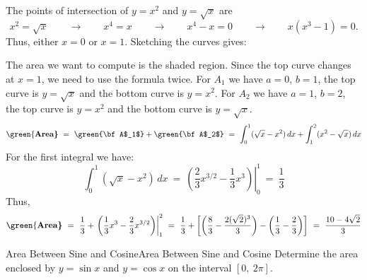 \begin{solution}
The points of intersection of $y=x^2$ and $y=\sqrt x$ are
$$x^2=\sqrt x\qquad\to \qquad x^4=x\qquad\to \qquad x^4-x=0 \qquad\to \qquad x(x^3-1)=0.$$
Thus, either $x=0$ or $x=1$.
Sketching the curves gives:



The area we want to compute is the shaded region. 
Since the top curve changes at $x=1$, we need to use the formula twice. 
For $A_1$ we have $a=0$, $b=1$, the top curve is $y=\sqrt x$ and the bottom curve is $y=x^2$. 
For $A_2$ we have $a=1$, $b=2$, the top curve is $y=x^2$ and the bottom curve is $y=\sqrt x$. 
$$\mbox{\green{\bf Area}}
~=~\mbox{\green{\bf A$_1$}}+\mbox{\green{\bf A$_2$}}  
~=~\int_0^1(\sqrt x-x^2)\,dx+\int_1^2(x^2-\sqrt x)\,dx$$
For the first integral we have:
$$\int_0^1(\sqrt x-x^2)\,dx  
~=~\left.\left(\frac{2}{3}x^{3/2}-\frac{1}{3}x^3\right)\right|_0^1  
~=~\frac{1}{3}$$
Thus,
$$\mbox{\green{\bf Area}}~=~\frac{1}{3}+\left.\left(\frac{1}{3}x^3-\frac{2}{3}x^{3/2}\right)\right|_1^2 
~=~\frac{1}{3}+\left[\left(\frac{8}{3}-\frac{2(\sqrt 2)^3}{3}\right)-\left(\frac{1}{3}-\frac{2}{3}\right)\right] 
~=~\frac{10-4\sqrt 2}{3}$$
\end{solution}

\begin{example}{Area Between Sine and Cosine}{Area Between Sine and Cosine}
Determine the area enclosed by $y=\sin x$ and $y=\cos x$ on the interval $[0,~2\pi]$.
\end{example}

